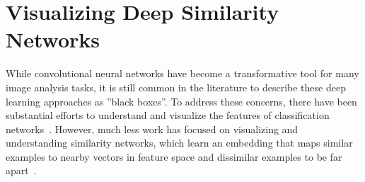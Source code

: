 
\chapter{Visualizing Deep Similarity Networks}
\label{ch:8}

While convolutional neural networks have become a transformative tool for many image analysis tasks, it is still common in the literature to describe these deep learning approaches as ''black boxes''. To address these concerns, there have been substantial efforts to understand and visualize the features of classification networks~\cite{bau2017network,netdissect2017,visualization_techreport,RTC16,deepInside,szegedy2015going,tolias2016rmac,ZeilerF13,cam,scenecnn_iclr15}. However, much less work has focused on visualizing and understanding similarity networks, which learn an embedding that maps similar examples to nearby vectors in feature space and dissimilar examples to be far apart~\cite{song2016deep,yi2014deep}. 

